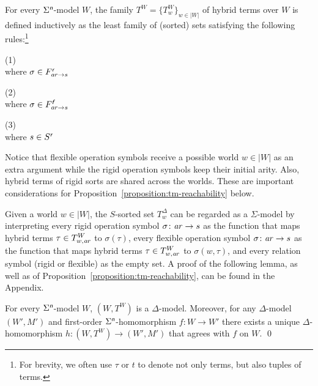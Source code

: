 \documentclass[a4paper,UKenglish,cleveref,autoref]{lipics-v2019}
\begin{document}
For every \(\Sigma^{\text{\normalfont\sffamily\itshape n}}\)-model \(W\),
the family \(T^{W} = \{ T^{W}_{w} \}_{w \in |W|}\) of hybrid terms over \(W\) is defined inductively as the least family of (sorted) sets satisfying the following rules:\footnote{For brevity, we often use \(\tau\) or \(t\) to denote not only terms, but also tuples of terms.}

\medskip
\noindent
\parbox{12.25em}{%
  \textsf{(1)}~\\[1ex]
   where \(\sigma \in F^{\text{\normalfont\sffamily\itshape r}}_{\mathit{a\mkern -1mu r} \to s}\)
}
\hfill
\parbox{12.25em}{%
  \textsf{(2)}~\\[1ex]
   where \(\sigma \in F^{\text{\normalfont\sffamily\itshape f}}_{\mathit{a\mkern -1mu r} \to s}\)
}
\hfill
\parbox{12.25em}{%
  \textsf{(3)}~\\[1ex]
   where \(s \in S^{\text{\normalfont\sffamily\itshape r}}\)
}
\medskip

\noindent Notice that flexible operation symbols receive a possible world \(w \in |W|\) as an extra argument while the rigid operation symbols keep their initial arity.
Also, hybrid terms of rigid sorts are shared across the worlds.
These are important considerations for Proposition~\ref{proposition:tm-reachability} below.

Given a world \(w \in |W|\), the \(S\)-sorted set \(T^{\Delta}_{w}\) can be regarded as a \(\Sigma\)-model by interpreting
every rigid operation symbol \(\sigma \colon \mathit{a\mkern -1mu r} \to s\) as the function that maps hybrid terms \(\tau \in T^{W}_{w, \mathit{a\mkern -1mu r}}\) to \(\sigma(\tau)\),
every flexible operation symbol \(\sigma \colon \mathit{a\mkern -1mu r} \to s\) as the function that maps hybrid terms \(\tau \in T^{W}_{w, \mathit{a\mkern -1mu r}}\) to \(\sigma(w, \tau)\),
and every relation symbol (rigid or flexible) as the empty set.
A proof of the following lemma, as well as of Proposition~\ref{proposition:tm-reachability}, can be found in the Appendix.

\begin{lemma} 
  \label{lemma:htm-freeness}
  For every\/ \(\Sigma^{\text{\normalfont\sffamily\itshape n}}\)-model\/ \(W\), \((W, T^{W})\) is a \(\Delta\)-model.
  Moreover, for any \(\Delta\)-model \((W', M')\) and first-order\/ \(\Sigma^{\text{\normalfont\sffamily\itshape n}}\)-homomorphism \(f \colon W \to W'\) there exists a unique \(\Delta\)-homomorphism \(h \colon (W, T^{W}) \to (W', M')\) that agrees with \(f\) on \(W\).
  \qed
\end{lemma}
\end{document}
